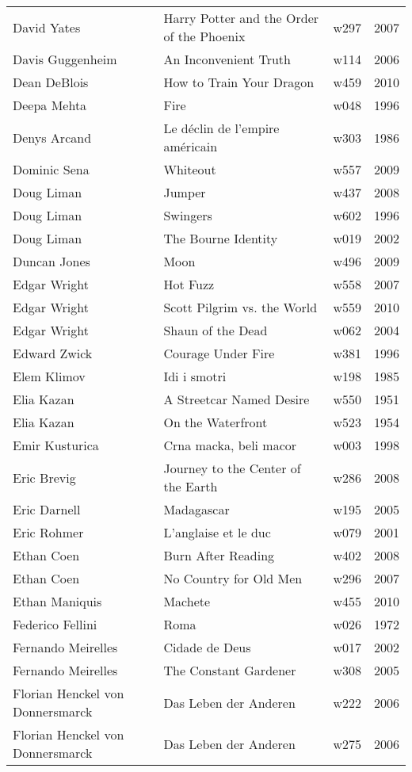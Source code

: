 \documentclass{article}
\begin{document}
\begin {center}
\begin{longtable}{l p{10cm} l l}
David Yates & Harry Potter and the Order of the Phoenix & w297 & 2007 \\
Davis Guggenheim & An Inconvenient Truth & w114 & 2006 \\
Dean DeBlois & How to Train Your Dragon & w459 & 2010 \\
Deepa Mehta & Fire & w048 & 1996 \\
Denys Arcand & Le déclin de l'empire américain & w303 & 1986 \\
Dominic Sena & Whiteout & w557 & 2009 \\
Doug Liman & Jumper & w437 & 2008 \\
Doug Liman & Swingers & w602 & 1996 \\
Doug Liman & The Bourne Identity & w019 & 2002 \\
Duncan Jones & Moon & w496 & 2009 \\
Edgar Wright & Hot Fuzz & w558 & 2007 \\
Edgar Wright & Scott Pilgrim vs. the World & w559 & 2010 \\
Edgar Wright & Shaun of the Dead & w062 & 2004 \\
Edward Zwick & Courage Under Fire & w381 & 1996 \\
Elem Klimov & Idi i smotri & w198 & 1985 \\
Elia Kazan & A Streetcar Named Desire & w550 & 1951 \\
Elia Kazan & On the Waterfront & w523 & 1954 \\
Emir Kusturica & Crna macka, beli macor & w003 & 1998 \\
Eric Brevig & Journey to the Center of the Earth & w286 & 2008 \\
Eric Darnell & Madagascar & w195 & 2005 \\
Eric Rohmer & L'anglaise et le duc & w079 & 2001 \\
Ethan Coen & Burn After Reading & w402 & 2008 \\
Ethan Coen & No Country for Old Men & w296 & 2007 \\
Ethan Maniquis & Machete & w455 & 2010 \\
Federico Fellini & Roma & w026 & 1972 \\
Fernando Meirelles & Cidade de Deus & w017 & 2002 \\
Fernando Meirelles & The Constant Gardener & w308 & 2005 \\
Florian Henckel von Donnersmarck & Das Leben der Anderen & w222 & 2006 \\
Florian Henckel von Donnersmarck & Das Leben der Anderen & w275 & 2006 \\

\end{longtable}
\end{center}
\end{document}
